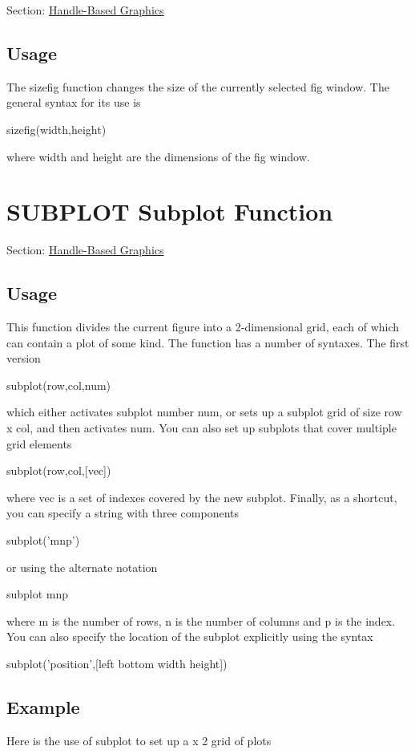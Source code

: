 Section\-: \hyperlink{sec_handle}{Handle-\/\-Based Graphics} \hypertarget{vtkwidgets_vtkxyplotwidget_Usage}{}\subsection{Usage}\label{vtkwidgets_vtkxyplotwidget_Usage}
The {\ttfamily sizefig} function changes the size of the currently selected fig window. The general syntax for its use is \begin{DoxyVerb}   sizefig(width,height)
\end{DoxyVerb}
 where {\ttfamily width} and {\ttfamily height} are the dimensions of the fig window. \hypertarget{handle_subplot}{}\section{S\-U\-B\-P\-L\-O\-T Subplot Function}\label{handle_subplot}
Section\-: \hyperlink{sec_handle}{Handle-\/\-Based Graphics} \hypertarget{vtkwidgets_vtkxyplotwidget_Usage}{}\subsection{Usage}\label{vtkwidgets_vtkxyplotwidget_Usage}
This function divides the current figure into a 2-\/dimensional grid, each of which can contain a plot of some kind. The function has a number of syntaxes. The first version \begin{DoxyVerb}   subplot(row,col,num)
\end{DoxyVerb}
 which either activates subplot number {\ttfamily num}, or sets up a subplot grid of size {\ttfamily row x col}, and then activates {\ttfamily num}. You can also set up subplots that cover multiple grid elements \begin{DoxyVerb}   subplot(row,col,[vec])
\end{DoxyVerb}
 where {\ttfamily vec} is a set of indexes covered by the new subplot. Finally, as a shortcut, you can specify a string with three components \begin{DoxyVerb}   subplot('mnp')
\end{DoxyVerb}
 or using the alternate notation \begin{DoxyVerb}   subplot mnp
\end{DoxyVerb}
 where {\ttfamily m} is the number of rows, {\ttfamily n} is the number of columns and {\ttfamily p} is the index. You can also specify the location of the subplot explicitly using the syntax \begin{DoxyVerb}   subplot('position',[left bottom width height])
\end{DoxyVerb}
\hypertarget{variables_struct_Example}{}\subsection{Example}\label{variables_struct_Example}
Here is the use of {\ttfamily subplot} to set up a { x 2} grid of plots


